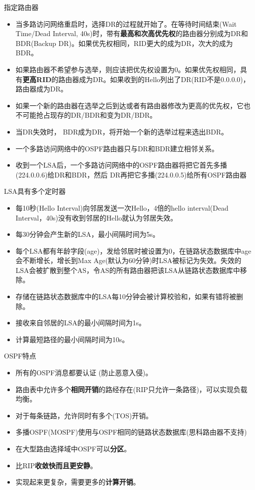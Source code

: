 指定路由器
\begin{itemize}
	\item 当多路访问网络重启时，选择DR的过程就开始了。在等待时间结束(Wait Time/Dead Interval, 40s)时，带有\textbf{最高和次高优先权}的路由器分别成为DR和BDR(Backup DR)。如果优先权相同，RID更大的成为DR，次大的成为BDR。
	\item 如果路由器不希望参与选举，则应该把优先权设置为0。如果优先权相同，具有\textbf{更高RID}的路由器成为DR。如果收到的Hello列出了DR(RID不是0.0.0.0)，路由器成为DR。
	\item 如果一个新的路由器在选举之后到达或者有路由器修改为更高的优先权，它也不可能抢占现存的DR/BDR和变为DR/BDR。
	\item 当DR失效时， BDR成为DR，将开始一个新的选举过程来选出BDR。
	\item 一个多路访问网络中的OSPF路由器只与DR和BDR建立相邻关系。
	\item 收到一个LSA后，一个多路访问网络中的OSPF路由器将把它首先多播(224.0.0.6)给DR和BDR，然后 DR再把它多播(224.0.0.5)给所有OSPF路由器
\end{itemize}

LSA具有多个定时器
\begin{itemize}
	\item 每10秒(Hello Interval)向邻居发送一次Hello，4倍的hello interval(Dead Interval，40s)没有收到邻居的Hello就认为邻居失效。
	\item 每30分钟会产生新的LSA，最小间隔时间为5s。
	\item 每个LSA都有年龄字段(age)，发给邻居时被设置为0，在链路状态数据库中age会不断增长，增长到Max Age(默认为60分钟)时LSA被标记为失效。失效的LSA会被扩散到整个AS，令AS的所有路由器把该LSA从链路状态数据库中移除。
	\item 存储在链路状态数据库中的LSA每10分钟会被计算校验和，如果有错将被删除。
	\item 接收来自邻居的LSA的最小间隔时间为1s。
	\item 计算最短路径的最小间隔时间为10s。
\end{itemize}

OSPF特点
\begin{itemize}
	\item 所有的OSPF消息都要认证 (防止恶意入侵)。
	\item 路由表中允许多个\textbf{相同开销}的路经存在(RIP只允许一条路径)，可以实现负载均衡。
	\item 对于每条链路，允许同时有多个(TOS)开销。
	\item 多播OSPF(MOSPF)使用与OSPF相同的链路状态数据库(思科路由器不支持)
	\item 在大型路由选择域中OSPF可以\textbf{分区}。
	\item 比RIP\textbf{收敛快而且更安静}。
	\item 实现起来更复杂，需要更多的\textbf{计算开销}。
\end{itemize}

